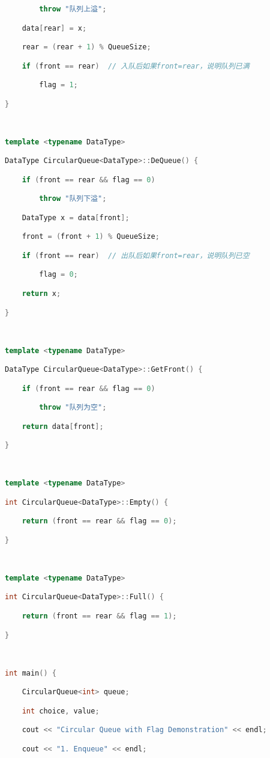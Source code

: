 \begin{lstlisting}[language=C++]
        throw "队列上溢";

    data[rear] = x;

    rear = (rear + 1) % QueueSize;

    if (front == rear)  // 入队后如果front=rear，说明队列已满

        flag = 1;

}

  

template <typename DataType>

DataType CircularQueue<DataType>::DeQueue() {

    if (front == rear && flag == 0)

        throw "队列下溢";

    DataType x = data[front];

    front = (front + 1) % QueueSize;

    if (front == rear)  // 出队后如果front=rear，说明队列已空

        flag = 0;

    return x;

}

  

template <typename DataType>

DataType CircularQueue<DataType>::GetFront() {

    if (front == rear && flag == 0)

        throw "队列为空";

    return data[front];

}

  

template <typename DataType>

int CircularQueue<DataType>::Empty() {

    return (front == rear && flag == 0);

}

  

template <typename DataType>

int CircularQueue<DataType>::Full() {

    return (front == rear && flag == 1);

}

  

int main() {

    CircularQueue<int> queue;

    int choice, value;

    cout << "Circular Queue with Flag Demonstration" << endl;

    cout << "1. Enqueue" << endl;


\end{lstlisting}
